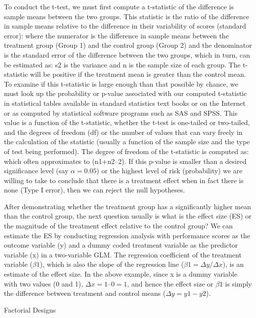 To conduct the t-test, we must first compute a t-statistic of the difference is sample means between the two groups. This statistic is the ratio of the difference in sample means relative to the difference in their variability of scores (standard error): where the numerator is the difference in sample means between the treatment group (Group 1) and the control group (Group 2) and the denominator is the standard error of the difference between the two groups, which in turn, can be estimated as: s2 is the variance and n is the sample size of each group. The t-statistic will be positive if the treatment mean is greater than the control mean. To examine if this t-statistic is large enough than that possible by chance, we must look up the probability or p-value associated with our computed t-statistic in statistical tables available in standard statistics text books or on the Internet or as computed by statistical software programs such as SAS and SPSS. This value is a function of the t-statistic, whether the t-test is one-tailed or two-tailed, and the degrees of freedom (df) or the number of values that can vary freely in the calculation of the statistic (usually a function of the sample size and the type of test being performed). The degree of freedom of the t-statistic is computed as: which often approximates to (n1+n2–2). If this p-value is smaller than a desired significance level (say $ \alpha = 0.05 $) or the highest level of risk (probability) we are willing to take to conclude that there is a treatment effect when in fact there is none (Type I error), then we can reject the null hypotheses.

After demonstrating whether the treatment group has a significantly higher mean than the control group, the next question usually is what is the effect size (ES) or the magnitude of the treatment effect relative to the control group? We can estimate the ES by conducting regression analysis with performance scores as the outcome variable (y) and a dummy coded treatment variable as the predictor variable (x) in a two-variable GLM. The regression coefficient of the treatment variable ($ \beta1 $), which is also the slope of the regression line ($ \beta1 = \Delta y/\Delta x $), is an estimate of the effect size. In the above example, since x is a dummy variable with two values (0 and 1), $ \Delta x = 1–0 = 1 $, and hence the effect size or $ \beta1 $ is simply the difference between treatment and control means ($ \Delta y = y1- y2 $).

Factorial Designs

